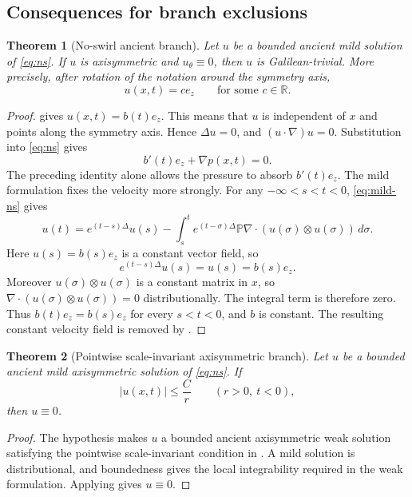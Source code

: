 \documentclass[11pt]{amsart}
\theoremstyle{plain}
\newtheorem{theorem}{Theorem}[section]
\theoremstyle{definition}
\theoremstyle{remark}
\numberwithin{equation}{section}
\begin{document}
\subsection{Consequences for branch exclusions}

\begin{theorem}[No-swirl ancient branch]\label{thm:no-swirl}
Let \(u\) be a bounded ancient mild solution of \eqref{eq:ns}.  If \(u\) is
axisymmetric and \(u_\theta\equiv0\), then \(u\) is Galilean-trivial.  More
precisely, after rotation of the notation around the symmetry axis,
\[
   u(x,t)=c e_z
   \qquad\text{for some }c\in\mathbb R .
\]
\end{theorem}

\begin{proof}
 gives \(u(x,t)=b(t)e_z\).  This means that \(u\) is
independent of \(x\) and points along the symmetry axis.  Hence
\(\Delta u=0\), and \((u\cdot\nabla)u=0\).  Substitution into \eqref{eq:ns}
gives
\[
   b'(t)e_z+\nabla p(x,t)=0 .
\]
The preceding identity alone allows the pressure to absorb \(b'(t)e_z\).
The mild formulation fixes the velocity more strongly.  For any
\(-\infty<s<t<0\), \eqref{eq:mild-ns} gives
\[
   u(t)
   =
   e^{(t-s)\Delta}u(s)
   -
   \int_s^t e^{(t-\sigma)\Delta}\mathbb P\nabla\cdot
      (u(\sigma)\otimes u(\sigma))\,d\sigma .
\]
Here \(u(s)=b(s)e_z\) is a constant vector field, so
\[
   e^{(t-s)\Delta}u(s)=u(s)=b(s)e_z .
\]
Moreover \(u(\sigma)\otimes u(\sigma)\) is a constant matrix in \(x\), so
\(\nabla\cdot(u(\sigma)\otimes u(\sigma))=0\) distributionally.  The integral
term is therefore zero.  Thus \(b(t)e_z=b(s)e_z\) for every \(s<t<0\), and
\(b\) is constant.  The resulting constant velocity field is removed by
.
\end{proof}

\begin{theorem}[Pointwise scale-invariant axisymmetric branch]\label{thm:pointwise}
Let \(u\) be a bounded ancient mild axisymmetric solution of \eqref{eq:ns}.
If
\[
   |u(x,t)|\le \frac{C}{r}
   \qquad (r>0,\ t<0),
\]
then \(u\equiv0\).
\end{theorem}

\begin{proof}
The hypothesis makes \(u\) a bounded ancient axisymmetric weak solution
satisfying the pointwise scale-invariant condition in
.  A mild solution is distributional, and
boundedness gives the local integrability required in the weak formulation.
Applying  gives \(u\equiv0\).
\end{proof}
\end{document}
